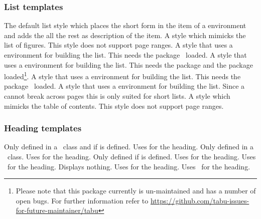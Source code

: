 \documentclass{acro-manual}
\begin{document}
\subsubsection{List templates}
\begin{templates}
    The default list style which places the short form in the item of a
     environment and adds the all the rest as description of
    the item.
    A style which mimicks the list of figures.  This style does not support
    page ranges.
    A style that uses a  environment for building the list.
    This needs the  package~\cite{pkg:longtable} loaded.
    A style that uses a  environment for building the
    list. This needs the  package and the 
    package~\cite{pkg:tabu} loaded\footnote{Please note that this package
      currently is un-maintained and has a number of open bugs. For further
      information refer to
      \url{https://github.com/tabu-issues-for-future-maintainer/tabu}}.
    A style that uses a  environment for
    building the list.  This needs the 
    package~\cite{pkg:supertabular} loaded.
    A style that uses a  environment for building the list.
    Since a  cannot break across pages this is only suited for
    short lists.
    A style which mimicks the table of contents.  This style does not support
    page ranges.
\end{templates}

\subsubsection{Heading templates}
\begin{templates}
    Only defined in a \KOMAScript\ class and if  is defined. Uses
     for the heading.
    Only defined in a \KOMAScript\ class. Uses  for the heading.
    Only defined if  is defined. Uses  for the heading.
    Uses \sarg\ for the heading.
    Displays nothing.
    Uses  for the heading.
    Uses \sarg\ for the heading.
\end{templates}
\end{document}

